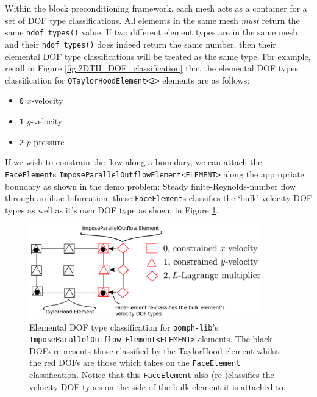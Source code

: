 Within the block preconditioning framework, each mesh acts as a container for 
a set of DOF type classifications. All elements in the same mesh \emph{must} 
return the same \texttt{ndof\_\allowbreak types()} value. If two different 
element types are in the same mesh, and their \texttt{ndof\_\allowbreak types()}
does indeed return the same number, then their elemental DOF type 
classifications will be treated as the same type. For example, recall in 
Figure \ref{fig:2DTH_DOF_classification} that the elemental DOF types 
classification for \texttt{Q\allowbreak TaylorHood\allowbreak Element<2>} 
elements are as follows:
\begin{itemize}
  \item \texttt{0} $x$-velocity
  \item \texttt{1} $y$-velocity
  \item \texttt{2} $p$-pressure
\end{itemize}
If we wish to constrain the flow along a boundary, we can attach the 
\texttt{Face\allowbreak Element}s 
\texttt{Impose\allowbreak Parallel\allowbreak Outflow\allowbreak Element<ELEMENT>} 
along the appropriate boundary as shown in the demo problem: Steady 
finite-Reynolds-number flow through an iliac bifurcation, these 
\texttt{Face\allowbreak Element}s classifies the `bulk' velocity DOF types 
as well as it's own DOF type as shown in Figure 
\ref{fig:2DFACE_DOF_classification}.
\begin{figure}[H]
\centering
\includegraphics[width=0.9\textwidth]{./pic/faceelemenet_dof_classification.pdf}
\caption{Elemental DOF type classification for \texttt{oomph-\allowbreak lib}'s
  \texttt{Impose\allowbreak Parallel\allowbreak Outflow\allowbreak
    Element<ELEMENT>} elements. The black DOFs represents those classified by
  the TaylorHood element whilst the red DOFs are those which takes on the
  \texttt{Face\allowbreak Element} classification. Notice that this
  \texttt{Face\allowbreak Element} also (re-)classifies the velocity DOF types
  on the side of the bulk element it is attached to.}
\label{fig:2DFACE_DOF_classification}
\end{figure}

